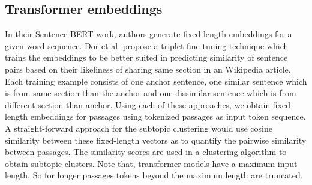\subsection{Transformer embeddings} In their Sentence-BERT work, authors generate fixed length embeddings for a given word sequence. Dor et al. \cite{dor2018learning} propose a triplet fine-tuning technique which trains the embeddings to be better suited in predicting similarity of sentence pairs based on their likeliness of sharing same section in an Wikipedia article. Each training example consists of one anchor sentence, one similar sentence which is from same section than the anchor and one dissimilar sentence which is from different section than anchor. Using each of these approaches, we obtain fixed length embeddings for passages using tokenized passages as input token sequence. A straight-forward approach for the subtopic clustering would use cosine similarity between these fixed-length vectors as to quantify the pairwise similarity between passages. The similarity scores are used in  a clustering algorithm to obtain subtopic clusters. Note that, transformer models have a maximum input length. So for longer passages tokens beyond the maximum length are truncated.

